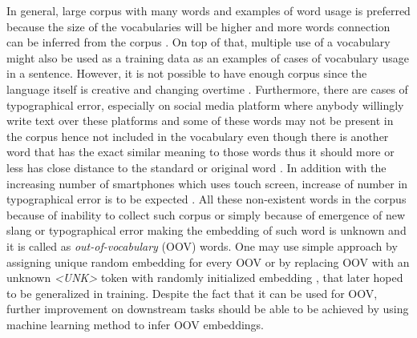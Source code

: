     In general, large corpus with many words and examples of word
    usage is preferred because the size of the vocabularies will be
    higher and more words connection can be inferred from the corpus
    \citep{size2018kutuzov}. On top of that, multiple use of a
    vocabulary might also be used as a training data as an examples of
    cases of vocabulary usage in a sentence. However, it is not
    possible to have enough corpus since the language itself is
    creative and changing overtime \citep{forrester2008abrief,
    speech2009Jurafsky:2009:SLP:1214993}. Furthermore, there are cases
    of typographical error, especially on social media platform where
    anybody willingly write text over these platforms
    \citep{Liu2010SentimentAA} and some of these words may not be
    present in the corpus hence not included in the vocabulary even
    though there is another word that has the exact similar meaning to
    those words thus it should more or less has close distance to the
    standard or original word \citep{mapping2012eisenstein}. In
    addition with the increasing number of smartphones which uses
    touch screen, increase of number in typographical error is to be
    expected \citep{ghosh2017correction}. All these non-existent words
    in the corpus because of inability to collect such corpus or
    simply because of emergence of new slang or typographical error
    making the embedding of such word is unknown and it is called as
    \textit{out-of-vocabulary} (OOV) words. One may use simple
    approach by assigning unique random embedding for every OOV or by
    replacing OOV with an unknown \textit{\textless UNK\textgreater}
    token with randomly initialized embedding
    \citep{predicting2019garneau}, that later hoped to be generalized
    in training. Despite the fact that it can be used for OOV, further
    improvement on downstream tasks should be able to be achieved by
    using machine learning method to infer OOV embeddings.

